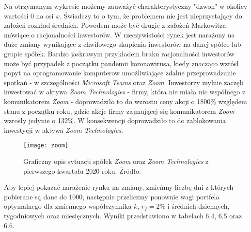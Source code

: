 \documentclass[magister]{dyplom}
\begin{document}
Na otrzymanym wykresie możemy zauważyć charakterystyczny "dzwon" w okolicy wartości $0$ na osi $x$. Świadczy to o tym, że problemem nie jest nieprzystający do założeń rozkład średnich. Powodem może być drugie z założeń Markowitza - mówiące o racjonalności inwestorów. W rzeczywistości rynek jest narażony na duże zmiany wynikające z chwilowego skupienia inwestorów na danej spółce lub grupie spółek\cite{simplifiedmarkowitz}. Bardzo jaskrawym przykładem braku racjonalności inwestorów może być przypadek z początku pandemii koronawirusa, kiedy znacząco wzrósł popyt na oprogramowanie komputerow umożliwiające zdalne przeprowadzanie spotkań - w szczególności \textit{Microsoft Teams} oraz \textit{Zoom}. Inwestorzy mylnie zaczęli inwestować w aktywa \textit{Zoom Technologies} - firmy, która nie miała nic wspólnego z komunikatorem \textit{Zoom} - doprowadziło to do wzrostu ceny akcji o 1800\% względem stanu z początku roku, gdzie akcje firmy zajmującej się komunikatorem \textit{Zoom} wzrosły jedynie o 132\%. W konsekwencji doprowadziło to do zablokowania inwestycji w aktywa \textit{Zoom Technologies}.\cite{zoominvest}

\begin{figure}[ht]
	\centering
	\texttt{[image: zoom]}
	\caption{Graficzny opis sytuacji spółek \textit{Zoom} oraz \textit{Zoom Technologies} z pierwszego kwartału 2020 roku. Źródło:\cite{zoominvest}}
\end{figure}
\newpage
Aby lepiej pokazać narażenie rynku na zmiany, zmieńmy liczbę dni z których pobierane są dane do 1000, następnie przeliczmy ponownie wagi portfela optymalnego dla zmiennego współczynnika $k$, $r_f = 2\%$ i średnich dziennych, tygodniowych oraz miesięcznych. Wyniki przedstawiono w tabelach 6.4, 6.5 oraz 6.6.
\end{document}
